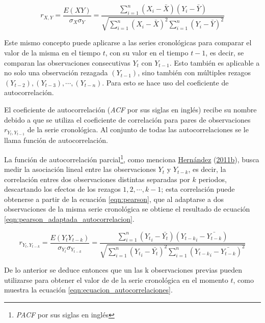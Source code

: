 \documentclass[
]{article}
\begin{document}
\begin{equation}
\label{eqn:pearson}
r_{X,Y}=\frac{E(XY)}{\sigma_X \sigma_Y} = \frac{\sum_{i=1}^n \left(X_i- \bar X\right) \left(Y_i- \bar Y\right)}{\sqrt{\sum_{i=1}^n \left(X_i- \bar X\right)^2 \sum_{i=1}^n \left(Y_i- \bar Y\right)^2}}
\end{equation}

Este mismo concepto puede aplicarse a las series cronológicas para
comparar el valor de la misma en el tiempo \(t\), con su valor en el
tiempo \(t-1\), es decir, se comparan las observaciones consecutivas
\(Y_t\) con \(Y_{t-1}\). Esto también es aplicable a no solo una
observación rezagada \((Y_{t-1})\), sino también con múltiples rezagos
\((Y_{t-2}), (Y_{t-3}), \cdots,(Y_{t-n})\). Para esto se hace uso del
coeficiente de autocorrelación.

El coeficiente de autocorrelación (\emph{ACF} por sus siglas en inglés)
recibe su nombre debido a que se utiliza el coeficiente de correlación
para pares de observaciones \(r_{Y_t, Y_{t-1}}\) de la serie
cronológica. Al conjunto de todas las autocorrelaciones se le llama
función de autocorrelación.

La función de autocorrelación parcial\footnote{\emph{PACF} por sus
  siglas en inglés}, como menciona
\protect\hyperlink{ref-oscarh-4}{Hernández}
(\protect\hyperlink{ref-oscarh-4}{2011b}), busca medir la asociación
lineal entre las observaciones \(Y_t\) y \(Y_{t-k}\), es decir, la
correlación entres dos observaciones distintas separadas por \(k\)
periodos, descartando los efectos de los rezagos \(1,2, \cdots ,k-1\);
esta correlación puede obtenerse a partir de la ecuación
\ref{eqn:pearson}, que al adaptarse a dos observaciones de la misma
serie cronológica se obtiene el resultado de ecuación
\ref{eqn:pearson_adaptada_autocorrelacion}.

\begin{equation}
\label{eqn:pearson_adaptada_autocorrelacion}
r_{{Y_t},{Y_{t-k}}}=\frac{E({Y_t}{Y_{t-k}})}{\sigma_{Y_t} \sigma_{Y_{t-k}}} = \frac{\sum_{i=1}^n \left({Y_t}_i- \bar {Y_t}\right) \left({Y_{t-k}}_i- \bar {Y_{t-k}}\right)}{\sqrt{\sum_{i=1}^n \left({Y_t}_i- \bar {Y_t}\right)^2 \sum_{i=1}^n \left({Y_{t-k}}_i- \bar {Y_{t-k}}\right)^2}}
\end{equation}

De lo anterior se deduce entonces que un las k observaciones previas
pueden utilizarse para obtener el valor de de la serie cronológica en el
momento \(t\), como muestra la ecuación
\ref{eqn:ecuacion_autocorrelaciones}.
\end{document}

